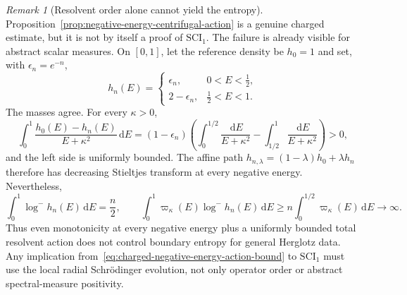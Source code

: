 \documentclass[11pt]{article}
\newcommand{\dd}{\,\mathrm d}
\theoremstyle{definition}
\theoremstyle{remark}
\newtheorem{remark}[theorem]{Remark}
\begin{document}
\begin{remark}[Resolvent order alone cannot yield the entropy]
\label{rem:resolvent-order-not-entropy}
Proposition~\ref{prop:negative-energy-centrifugal-action} is a genuine charged
estimate, but it is not by itself a proof of $\mathrm{SCI}_1$.  The failure is
already visible for abstract scalar measures.  On $[0,1]$, let the reference
density be $h_0=1$ and set, with $\epsilon_n=e^{-n}$,
\begin{equation}
 h_n(E)=\begin{cases}
  \epsilon_n,&0<E<\frac12,\\
  2-\epsilon_n,&\frac12<E<1.
 \end{cases}
 \label{eq:monotone-Stieltjes-entropy-test}
\end{equation}
The masses agree.  For every $\kappa>0$,
\begin{equation}
 \int_0^1\frac{h_0(E)-h_n(E)}{E+\kappa^2}\dd E
 =(1-\epsilon_n)\left(
  \int_0^{1/2}\frac{\dd E}{E+\kappa^2}
  -\int_{1/2}^1\frac{\dd E}{E+\kappa^2}\right)>0,
 \label{eq:all-negative-energy-Stieltjes-order}
\end{equation}
and the left side is uniformly bounded.  The affine path
$h_{n,\lambda}=(1-\lambda)h_0+\lambda h_n$ therefore has decreasing Stieltjes
transform at every negative energy.  Nevertheless,
\begin{equation}
 \int_0^1\log^-h_n(E)\dd E=\frac n2,
 \qquad
 \int_0^1\varpi_\kappa(E)\log^-h_n(E)\dd E
 \geq n\int_0^{1/2}\varpi_\kappa(E)\dd E\longrightarrow\infty.
 \label{eq:Stieltjes-order-entropy-failure}
\end{equation}
Thus even monotonicity at every negative energy plus a uniformly bounded total
resolvent action does not control boundary entropy for general Herglotz data.
Any implication from~\eqref{eq:charged-negative-energy-action-bound} to
$\mathrm{SCI}_1$ must use the local radial Schr\"odinger evolution, not only
operator order or abstract spectral-measure positivity.
\end{remark}
\end{document}
